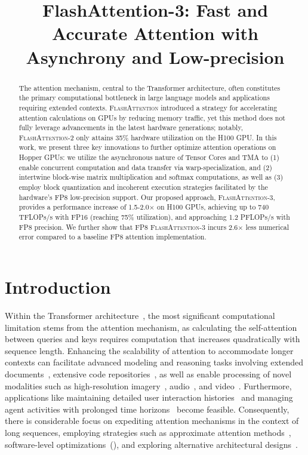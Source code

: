\title{FlashAttention-3: Fast and Accurate Attention with Asynchrony and Low-precision}

\begin{abstract}
The attention mechanism, central to the Transformer architecture, often constitutes the primary computational bottleneck in large language models and applications requiring extended contexts. \textsc{FlashAttention} introduced a strategy for accelerating attention calculations on GPUs by reducing memory traffic, yet this method does not fully leverage advancements in the latest hardware generations; notably, \textsc{FlashAttention-2} only attains 35\% hardware utilization on the H100 GPU. In this work, we present three key innovations to further optimize attention operations on Hopper GPUs: we utilize the asynchronous nature of Tensor Cores and TMA to (1) enable concurrent computation and data transfer via warp-specialization, and (2) intertwine block-wise matrix multiplication and softmax computations, as well as (3) employ block quantization and incoherent execution strategies facilitated by the hardware's FP8 low-precision support. Our proposed approach, \textsc{FlashAttention-3}, provides a performance increase of 1.5-2.0$\times$ on H100 GPUs, achieving up to 740 TFLOPs/s with FP16 (reaching 75\% utilization), and approaching 1.2 PFLOPs/s with FP8 precision. We further show that FP8 \textsc{FlashAttention-3} incurs 2.6$\times$ less numerical error compared to a baseline FP8 attention implementation.
\end{abstract}

\section{Introduction}
\label{sec:intro}

Within the Transformer architecture~\citep{vaswani2017attention}, the most significant computational limitation stems from the attention mechanism, as calculating the self-attention between queries and keys requires computation that increases quadratically with sequence length. Enhancing the scalability of attention to accommodate longer contexts can facilitate advanced modeling and reasoning tasks involving extended documents~\citep{guo2021longt5,shaham2022scrolls,peng2023yarn}, extensive code repositories~\citep{roziere2023code, li2023starcoder}, as well as enable processing of novel modalities such as high-resolution imagery~\citep{chen2022scaling}, audio~\citep{gulati2020conformer}, and video~\citep{ho2022video}. Furthermore, applications like maintaining detailed user interaction histories~\citep{sun2019bert4rec} and managing agent activities with prolonged time horizons~\citep{yao2022react} become feasible. Consequently, there is considerable focus on expediting attention mechanisms in the context of long sequences, employing strategies such as approximate attention methods~\citep{katharopoulos2020transformers,choromanski2020rethinking, tay2020efficient}, software-level optimizations~(\citep{rabe2021self,dao2022flashattention,kwon2023efficient}), and exploring alternative architectural designs~\citep{peng2023rwkv,sun2023retentive,gu2023mamba}.

